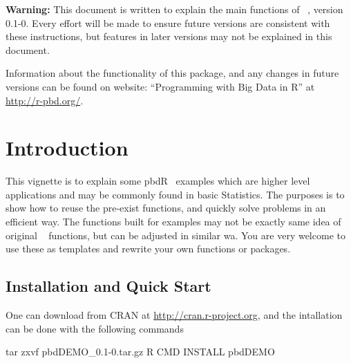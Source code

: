 
{\color{red} \bf Warning:} This document is written to explain the main
functions of ~\citep{Schmidt2012pbdDEMOpackage}, version 0.1-0.
Every effort will be made to ensure future versions are consistent with
these instructions, but features in later versions may not be explained
in this document.

Information about the functionality of this package,
and any changes in future versions can be found on website:
``Programming with Big Data in R'' at
\url{http://r-pbd.org/}.


\section[Introduction]{Introduction}
\label{sec:introduction}

This vignette is to explain some pbdR~\citep{pbdR2012}
examples which are higher level
applications and may be commonly found in basic Statistics.
The purposes is to show how to reuse the pre-exist functions, and
quickly solve problems in an efficient way.
The functions built for examples may not be exactly same idea of original
~\citep{Rcore}
functions, but can be adjusted in similar wa.
You are very welcome to use these as templates and rewrite your own functions
or packages.


\subsection[Installation and Quick Start]{Installation and Quick Start}
\label{sec:installation}

One can download  from CRAN at
\url{http://cran.r-project.org}, and
the intallation can be done with the following commands
\begin{Command}
tar zxvf pbdDEMO_0.1-0.tar.gz
R CMD INSTALL pbdDEMO
\end{Command}

